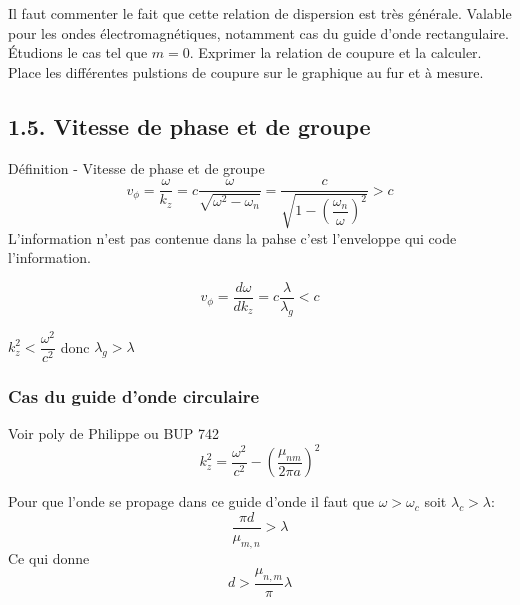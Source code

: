 \documentclass[french, a4paper, 10pt, twocolumn, landscape]{article}
\begin{document}

Il faut commenter le fait que cette relation de dispersion est très générale. Valable pour les ondes électromagnétiques, notamment cas du guide d'onde rectangulaire. Étudions le cas tel que $m=0$. Exprimer la relation de coupure et la calculer. Place les différentes pulstions de coupure sur le graphique au fur et à mesure.

\subsection*{1.5. Vitesse de phase et de groupe}

\begin{definition}{Définition - Vitesse de phase et de groupe}
	\begin{equation}
		v_{\phi} = \dfrac{\omega}{k_z} = c\dfrac{\omega}{\sqrt{\omega^2-\omega_{n}}}=\dfrac{c}{\sqrt{1-\left(\dfrac{\omega_n}{\omega}\right)^2}}>c
	\end{equation}
	L'information n'est pas contenue dans la pahse c'est l'enveloppe qui code l'information.

	\begin{equation}
		v_{\phi} = \frac{d\omega}{dk_z} = c\frac{\lambda}{\lambda_g}<c
	\end{equation}
\end{definition}

	$k_{z}^2 < \dfrac{\omega^2}{c^2} $ donc $ \lambda_g > \lambda $


\subsubsection*{Cas du guide d'onde circulaire}

Voir poly de Philippe ou BUP 742
\begin{equation}
	k_z^2 = \frac{\omega^2}{c^2}-\left(\frac{\mu_{nm}}{2\pi a}\right)^2
\end{equation}

Pour que l'onde se propage dans ce guide d'onde il faut que $\omega>\omega_c$ soit $\lambda_c>\lambda$:
\[\frac{\pi d}{\mu_{m,n}}>\lambda\]
Ce qui donne \[d>\frac{\mu_{n,m}}{\pi}\lambda\]
\end{document}
